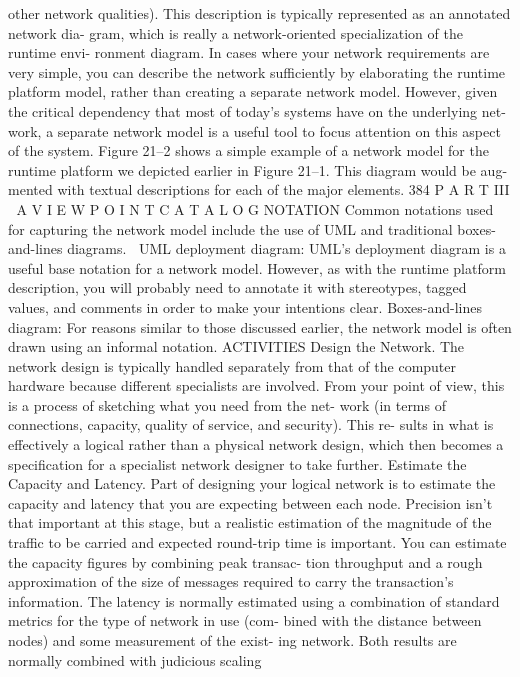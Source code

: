 other network qualities).
This description is typically represented as an annotated network dia-
gram, which is really a network-oriented specialization of the runtime envi-
ronment diagram. In cases where your network requirements are very simple,
you can describe the network sufficiently by elaborating the runtime platform
model, rather than creating a separate network model. However, given the
critical dependency that most of today’s systems have on the underlying net-
work, a separate network model is a useful tool to focus attention on this
aspect of the system.
Figure 21–2 shows a simple example of a network model for the runtime
platform we depicted earlier in Figure 21–1. This diagram would be aug-
mented with textual descriptions for each of the major elements.
384
 P A R T III  A V I E W P O I N T C A T A L O G
NOTATION Common notations used for capturing the network model include
the use of UML and traditional boxes-and-lines diagrams.
UML deployment diagram: UML’s deployment diagram is a useful base
notation for a network model. However, as with the runtime platform
description, you will probably need to annotate it with stereotypes,
tagged values, and comments in order to make your intentions clear.
Boxes-and-lines diagram: For reasons similar to those discussed earlier,
the network model is often drawn using an informal notation.
ACTIVITIES
Design the Network. The network design is typically handled separately from
that of the computer hardware because different specialists are involved. From
your point of view, this is a process of sketching what you need from the net-
work (in terms of connections, capacity, quality of service, and security). This re-
sults in what is effectively a logical rather than a physical network design, which
then becomes a specification for a specialist network designer to take further.
Estimate the Capacity and Latency. Part of designing your logical network
is to estimate the capacity and latency that you are expecting between each
node. Precision isn’t that important at this stage, but a realistic estimation of
the magnitude of the traffic to be carried and expected round-trip time is
important. You can estimate the capacity figures by combining peak transac-
tion throughput and a rough approximation of the size of messages required
to carry the transaction’s information. The latency is normally estimated
using a combination of standard metrics for the type of network in use (com-
bined with the distance between nodes) and some measurement of the exist-
ing network. Both results are normally combined with judicious scaling
